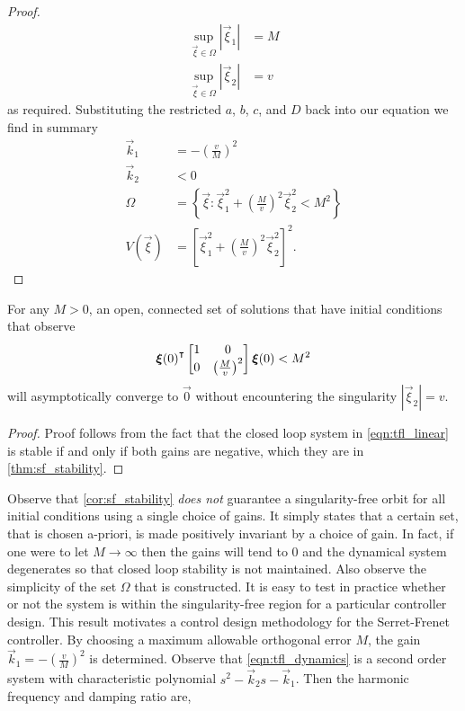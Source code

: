 \begin{proof}
    \begin{align*}
        \sup_{\vec{\xi}\in\Omega}{\left|\vec{\xi}_1\right|} &= M\\
        \sup_{\vec{\xi}\in\Omega}{\left|\vec{\xi}_2\right|} &= v
    \end{align*}
    as required. Substituting the restricted $a$, $b$, $c$, and $D$ back into our equation we find in summary
    \begin{align*}
        \vec{k}_1 &= -\left( \frac{v}{M} \right)^2\\
        \vec{k}_2 &< 0\\
        \Omega &= \left\{ \vec{\xi} : \vec{\xi}_1^2 + \left(\frac{M}{v}\right)^2 \vec{\xi}_2^2 < M^2 \right\}\\
        V(\vec{\xi}) &= \left[\vec{\xi}_1^2 + \left(\frac{M}{v}\right)^2\vec{\xi}_2^2 \right]^2.
    \end{align*}
\end{proof}
\begin{corollary}
    For any $M > 0$, an open, connected set of solutions that have initial conditions that observe
    \begin{equation*}
        {\bm{\xi}(0)}^{\intercal}
        \begin{bmatrix}
            1 & 0\\
            0 & \left(\frac{M}{v}\right)^2
        \end{bmatrix}
        \bm{\xi}(0)
        <
        M^2
    \end{equation*}
    will asymptotically converge to $\vec{0}$ without encountering the singularity $\left|\vec{\xi}_2\right|=v$.
    \label{cor:sf_stability}
\end{corollary}
\begin{proof}
    Proof follows from the fact that the closed loop system in \eqref{eqn:tfl_linear} is stable if and only if both gains are negative, which they are in \eqref{thm:sf_stability}.
\end{proof}
Observe that \eqref{cor:sf_stability} \emph{does not} guarantee a singularity-free orbit for all initial conditions using a single choice of gains. It simply states that a certain set, that is chosen a-priori, is made positively invariant by a choice of gain. In fact, if one were to let $M\to\infty$ then the gains will tend to $0$ and the dynamical system degenerates so that closed loop stability is not maintained. Also observe the simplicity of the set $\Omega$ that is constructed. It is easy to test in practice whether or not the system is within the singularity-free region for a particular controller design. This result motivates a control design methodology for the Serret-Frenet controller. By choosing a maximum allowable orthogonal error $M$, the gain $\vec{k}_1 = -(\frac{v}{M})^2$ is determined. Observe that \eqref{eqn:tfl_dynamics} is a second order system with characteristic polynomial $s^2 - \vec{k}_2 s - \vec{k}_1$. Then the harmonic frequency and damping ratio are,
